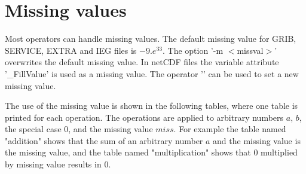 \section{Missing values}

Most operators can handle missing values.
The default missing value for GRIB, SERVICE, EXTRA and IEG files is $-9.e^{33}$. 
The {\CDO} option '-m $<$missval$>$' overwrites the default missing value.
In netCDF files the variable attribute '\_FillValue' is used as a missing value.
The operator '' can be used to set a new missing value.

The {\CDO} use of the missing value is shown in the following tables,
where one table is printed for each operation.
The operations are applied to arbitrary numbers $a$, $b$, the special case $0$,
and the missing value $miss$.
For example the table named "addition" shows that the sum of an
arbitrary number $a$ and the missing value is the missing value,
and the table named "multiplication" shows that $0$ multiplied by missing
value results in $0$.


